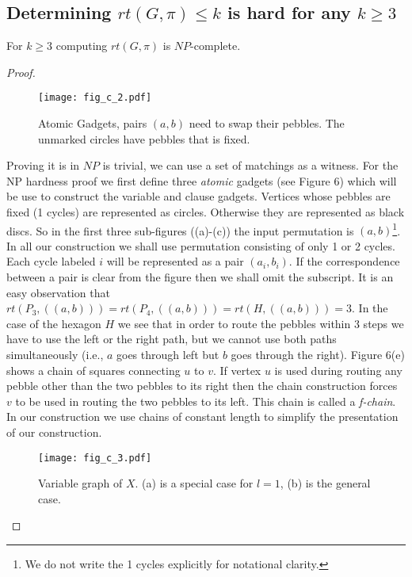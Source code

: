 \documentclass[runningheads,a4paper]{llncs}
\begin{document}
\subsection{Determining $rt(G,\pi) \le k$ is hard for any $k \ge 3$}
\begin{theorem}
	For $k \ge 3$ computing $rt(G,\pi)$ is $NP$-complete.
\end{theorem}

\begin{proof}
	\begin{figure}[h]
		\texttt{[image: fig\_c\_2.pdf]}
		\centering
		\caption{Atomic Gadgets, pairs $ (a,b) $ need to swap their pebbles. The unmarked circles have pebbles that is fixed.} 
	\end{figure}
	Proving it is in $NP$ is trivial, we can use a set of matchings as a witness. For the NP hardness proof we first define three \textit{atomic} gadgets (see Figure 6) which will be use to construct the variable and clause gadgets. Vertices whose pebbles are fixed (1 cycles) are represented as circles.  Otherwise they are represented as black discs. So in the first three sub-figures ((a)-(c)) the input permutation is $(a,b)$\footnote{We do not write the 1 cycles explicitly for notational clarity.}. In all our construction we shall use permutation consisting of only 1 or 2 cycles. Each cycle labeled $i$ will be represented as a pair $(a_i,b_i)$. If the correspondence between a pair is clear from the figure then we shall omit the subscript.  It is an easy observation that $rt(P_{3},((a,b))) = rt(P_{4},((a,b))) = rt(H,((a,b))) = 3$. In the case of the hexagon $H$ we see that in order to route the pebbles within 3 steps we have to use the left or the right path, but we cannot use both paths simultaneously (i.e., $a$ goes through left but $b$ goes through the right). Figure 6(e) shows a chain of squares connecting $u$ to $v$. If vertex $u$ is used during routing any pebble other than the two pebbles to its right then the chain construction forces $v$ to be used in routing the two pebbles to its left. This chain is called a \textit{f-chain}. In our construction we  use chains of constant length to simplify the presentation of our construction.  
	\begin{figure}[h]
		\texttt{[image: fig\_c\_3.pdf]}
		\centering
		\caption{Variable graph of $X$. (a) is a special case for $l=1$, (b) is the general case.} 
	\end{figure}

\end{proof}
\end{document}
